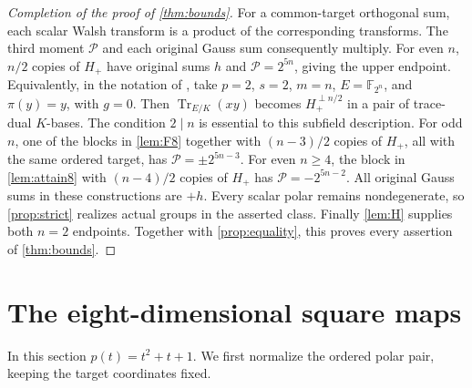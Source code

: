 \documentclass[11pt,a4paper]{article}
\theoremstyle{definition}
\theoremstyle{remark}
\numberwithin{equation}{section}
\newcommand{\F}{\mathbb F}
\newcommand{\Tr}{\operatorname{Tr}}
\newcommand{\Pm}{\mathcal P}
\newcommand{\Hp}{H_+}
\begin{document}
\begin{proof}[Completion of the proof of \cref{thm:bounds}]
For a common-target orthogonal sum, each scalar Walsh transform is a
product of the corresponding transforms. The third moment \(\Pm\)
and each original Gauss sum consequently multiply.
For even \(n\), \(n/2\) copies of \(\Hp\) have original sums \(h\)
and \(\Pm=2^{5n}\), giving the upper endpoint. Equivalently, in the notation of
\citep[Theorem 2(i)]{CMP18}, take \(p=2\), \(s=2\), \(m=n\),
\(E=\F_{2^n}\), and \(\pi(y)=y\), with \(g=0\).
Then \(\Tr_{E/K}(xy)\) becomes \(\Hp^{\perp n/2}\) in a pair of
trace-dual \(K\)-bases. The condition \(2\mid n\) is essential to this
subfield description.
For odd \(n\), one of the blocks in \cref{lem:F8} together with
\((n-3)/2\) copies of \(\Hp\), all with the same ordered target,
has \(\Pm=\pm2^{5n-3}\).
For even \(n\geq4\), the block in \cref{lem:attain8} with
\((n-4)/2\) copies of \(\Hp\) has \(\Pm=-2^{5n-2}\).
All original Gauss sums in these constructions are \(+h\).
Every scalar polar remains nondegenerate, so \cref{prop:strict}
realizes actual groups in the asserted class.
Finally \cref{lem:H} supplies both \(n=2\) endpoints.
Together with \cref{prop:equality}, this proves every assertion of
\cref{thm:bounds}.
\end{proof}
\section{The eight-dimensional square maps}\label{sec:core}
In this section \(p(t)=t^2+t+1\). We first normalize the ordered
polar pair, keeping the target coordinates fixed.
\end{document}

